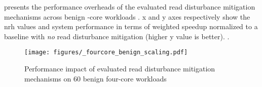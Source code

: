  presents the performance overheads of the evaluated read disturbance mitigation mechanisms across  benign -core workloads .
x and y axes respectively show the \gls{nrh} values and system performance in terms of weighted speedup normalized to a baseline with \emph{no} read disturbance mitigation (higher y value is better).
.

\begin{figure}[h]
\centering
\texttt{[image: figures/\_fourcore\_benign\_scaling.pdf]}
\caption{Performance impact of evaluated read disturbance mitigation mechanisms on 60 benign four-core workloads}
\label{fig:benign_scaling}
\end{figure}

